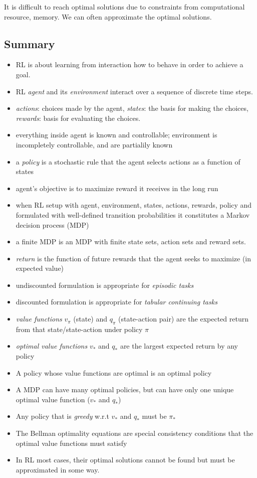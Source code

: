 \documentclass[lang=en,mode=geye,device=normal,color=blue,14pt]{elegantnote}
\DeclareMathOperator*{\1}{\mathbbm{1}}
\begin{document}
It is difficult to reach optimal solutions due to constraints from computational resource, memory. We can often approximate the optimal solutions.

\subsection{Summary}

\begin{itemize}
\item RL is about learning from interaction how to behave in order to achieve a goal.
\item RL \textit{agent} and its \textit{environment} interact over a sequence of discrete time steps.
\item \textit{actions}: choices made by the agent, \textit{states}: the basis for making the choices, \textit{rewards}: basis for evaluating the choices.
\item everything inside agent is known and controllable; environment is incompletely controllable, and are partialily known
\item a \textit{policy} is a stochastic rule that the agent selects actions as a function of states
\item agent's objective is to maximize reward it receives in the long run
\item when RL setup with agent, environment, states, actions, rewards, policy and formulated with well-defined transition probabilities it constitutes a Markov decision process (MDP)
\item a finite MDP is an MDP with finite state sets, action sets and reward sets.
\item \textit{return} is the function of future rewards that the agent seeks to maximize (in expected value)
\item undiscounted formulation is appropriate for \textit{episodic tasks}
\item discounted formulation is appropriate for \textit{tabular continuing tasks}
\item \textit{value functions} $v_\pi$ (state) and $q_\pi$ (state-action pair) are the expected return from that state/state-action under policy $\pi$
\item \textit{optimal value functions} $v_*$ and $q_*$ are the largest expected return by any policy
\item A policy whose value functions are optimal is an optimal policy
\item A MDP can have many optimal policies, but can have only one unique optimal value function ($v_*$ and $q_*$)
\item Any policy that is \textit{greedy} w.r.t $v_*$ and $q_*$ must be $\pi_*$
\item The Bellman optimality equations are special consistency conditions that the optimal value functions must satisfy
\item In RL most cases, their optimal solutions cannot be found but must be approximated in some way.
\end{itemize}
\end{document}
